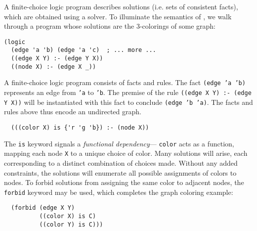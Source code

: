 \documentclass[dvipsnames,sigplan,screen,acmthm,nonacm]{acmart}
\begin{document}
A finite-choice logic program describes solutions
(i.e. sets of consistent facts), which are obtained using a solver.
To illuminate the semantics of \miniDusa{}, we walk through
a program whose solutions are the 3-colorings of some graph:

\begin{verbatim}
(logic
  (edge 'a 'b) (edge 'a 'c)  ; ... more ...
  ((edge X Y) :- (edge Y X))
  ((node X) :- (edge X _))
\end{verbatim}

A finite-choice logic program consists of facts and rules.
The fact \texttt{(edge 'a 'b)} represents an edge from \texttt{'a} to \texttt{'b}.
The premise of the rule \texttt{((edge X Y) :- (edge Y X))} will be
instantiated with this fact to conclude \texttt{(edge 'b 'a)}.
The facts and rules above thus encode an undirected graph.

\begin{verbatim}
  (((color X) is {'r 'g 'b}) :- (node X))
\end{verbatim}

The \texttt{is} keyword signals a \emph{functional dependency}---%
\texttt{color} acts as a function, mapping each node \texttt{X} to a unique
choice of color. Many solutions will arise,
each corresponding to a distinct combination of choices made.
Without any added constraints, the solutions will enumerate all
possible assignments of colors to nodes. To forbid solutions from
assigning the same color to adjacent nodes, 
the \texttt{forbid} keyword may be used, which
completes the graph coloring example:

\begin{verbatim}
  (forbid (edge X Y)
          ((color X) is C)
          ((color Y) is C)))
\end{verbatim}
\end{document}
